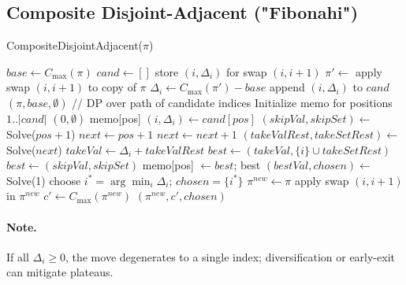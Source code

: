 \subsection{Composite Disjoint-Adjacent ("Fibonahi")}
\begin{algorithm}[h]
  \caption{CompositeDisjointAdjacent($\pi$)}
  \begin{algorithmic}[1]
    \State $base \gets C_{\max}(\pi)$
    \State $cand \gets []$  \Comment store $(i, \Delta_i)$ for swap $(i,i+1)$
      \State $\pi' \gets$ apply swap $(i,i+1)$ to copy of $\pi$
      \State $\Delta_i \gets C_{\max}(\pi') - base$
      \State append $(i, \Delta_i)$ to $cand$
    \EndFor
     \Return $(\pi, base, \emptyset)$ \EndIf
    \State // DP over path of candidate indices
    \State Initialize memo for positions $1..|cand|$
       \Return $(0, \emptyset)$ \EndIf
       \Return memo[pos] \EndIf
      \State $(i, \Delta_i) \gets cand[pos]$
      \State $(skipVal, skipSet) \gets$ Solve($pos+1$)
      \State $next \gets pos+1$
       $next \gets next+1$ \EndWhile
      \State $(takeValRest, takeSetRest) \gets$ Solve($next$)
      \State $takeVal \gets \Delta_i + takeValRest$
        \State $best \gets (takeVal, \{i\} \cup takeSetRest)$
      \Else
        \State $best \gets (skipVal, skipSet)$
      \EndIf
      \State memo[pos] $\gets best$; \Return best
    \EndFunction
    \State $(bestVal, chosen) \gets$ Solve(1)
      \State choose $i^* = \arg\min_i \Delta_i$; $chosen = \{i^*\}$
    \EndIf
    \State $\pi^{new} \gets \pi$
      \State apply swap $(i,i+1)$ in $\pi^{new}$
    \EndFor
    \State $c' \gets C_{\max}(\pi^{new})$
    \State \Return $(\pi^{new}, c', chosen)$
  \end{algorithmic}
\end{algorithm}

\paragraph{Note.} If all $\Delta_i \ge 0$, the move degenerates to a single index; diversification or early-exit can mitigate plateaus.

